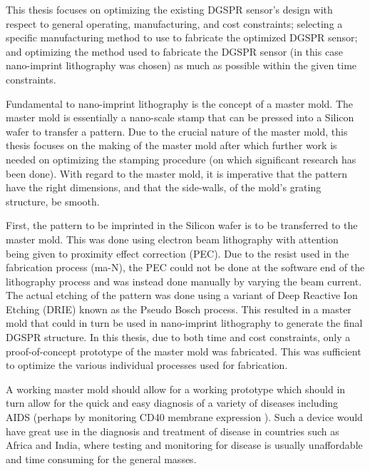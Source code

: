 This thesis focuses on optimizing the existing DGSPR sensor's design with respect to general operating, manufacturing, and cost constraints; selecting a specific manufacturing method to use to fabricate the optimized DGSPR sensor; and optimizing the method used to fabricate the DGSPR sensor (in this case nano-imprint lithography was chosen) as much as possible within the given time constraints. 

Fundamental to nano-imprint lithography is the concept of a master mold. The master mold is essentially a nano-scale stamp that can be pressed into a Silicon wafer to transfer a pattern. Due to the crucial nature of the master mold, this thesis focuses on the making of the master mold after which further work is needed on optimizing the stamping procedure (on which significant research has been done). With regard to the master mold, it is imperative that the pattern have the right dimensions, and that the side-walls, of the mold's grating structure, be smooth. 

First, the pattern to be imprinted in the Silicon wafer is to be transferred to the master mold. This was done using electron beam lithography with attention being given to proximity effect correction (PEC). Due to the resist used in the fabrication process (ma-N), the PEC could not be done at the software end of the lithography process and was instead done manually by varying the beam current. The actual etching of the pattern was done using a variant of Deep Reactive Ion Etching (DRIE) known as the Pseudo Bosch process. This resulted in a master mold that could in turn be used in nano-imprint lithography to generate the final DGSPR structure. In this thesis, due to both time and cost constraints, only a proof-of-concept prototype of the master mold was fabricated. This was sufficient to optimize the various individual processes used for fabrication. 
	
A working master mold should allow for a working prototype which should in turn allow for the quick and easy diagnosis of a variety of diseases including AIDS (perhaps by monitoring CD40 membrane expression \cite{cd40}). Such a device would have great use in the diagnosis and treatment of disease in countries such as Africa and India, where testing and monitoring for disease is usually unaffordable and time consuming for the general masses.  


